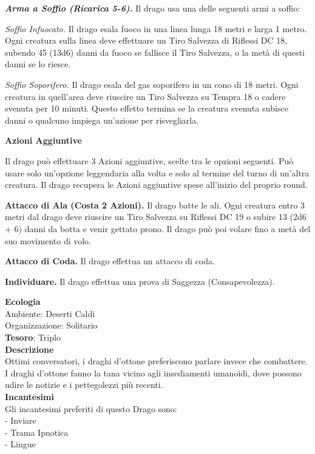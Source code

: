\begin{multicols}{2}
	\textit{\textbf{Arma a Soffio (Ricarica 5-6).}} Il drago usa una delle seguenti armi a soffio:

	\textit{Soffio Infuocato.} Il drago esala fuoco in una linea lunga 18 metri e larga 1 metro. Ogni creatura sulla linea deve effettuare un Tiro Salvezza di Riflessi DC 18, subendo 45 (13d6) danni da fuoco se fallisce il Tiro Salvezza, o la metà di questi danni se lo riesce.

	\textit{Soffio Soporifero.} Il drago esala del gas soporifero in un cono di 18 metri. Ogni creatura in quell'area deve riuscire un Tiro Salvezza su Tempra 18 o cadere svenuta per 10 minuti. Questo effetto termina se la creatura svenuta subisce danni o qualcuno impiega un'azione per risvegliarla.

	\textbf{Azioni Aggiuntive}

	Il drago può effettuare 3 Azioni aggiuntive, scelte tra le opzioni seguenti. Può usare solo un'opzione leggendaria alla volta e solo al termine del turno di un'altra creatura. Il drago recupera le Azioni aggiuntive spese all'inizio del proprio round.

	\textbf{Attacco di Ala (Costa 2 Azioni).} Il drago batte le ali. Ogni creatura entro 3 metri dal drago deve riuscire un Tiro Salvezza su Riflessi DC 19 o subire 13 (2d6 + 6) danni da botta e venir gettato prono. Il drago può poi volare fino a metà del suo movimento di volo.

	\textbf{Attacco di Coda.} Il drago effettua un attacco di coda.

	\textbf{Individuare.} Il drago effettua una prova di Saggezza (Consapevolezza).

	\textbf{Ecologia}\\
	Ambiente: Deserti Caldi\\
	Organizzazione: Solitario\\
	\textbf{Tesoro}: Triplo\\
	\textbf{Descrizione}\\
	Ottimi conversatori, i draghi d'ottone preferiscono parlare invece che combattere. I draghi d'ottone fanno la tana vicino agli insediamenti umanoidi, dove possono udire le notizie e i pettegolezzi più recenti.\\
	\textbf{Incantesimi}\\
	Gli incantesimi preferiti di questo Drago sono:\\
	- Inviare\\
	- Trama Ipnotica\\
	- Lingue


\end{multicols}
